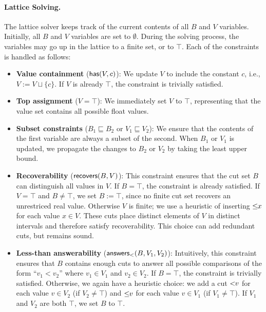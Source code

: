 \paragraph{Lattice Solving.}
The lattice solver keeps track of the current contents of all $B$ and $V$ variables.
Initially, all $B$ and $V$ variables are set to $\emptyset$.
During the solving process, the variables may go up in the lattice to a finite set, or to $\top$.
Each of the constraints is handled as follows:

\begin{itemize}[leftmargin=*]
    \item \textbf{Value containment} ($\mathsf{has}(V, c)$): We update $V$ to include the constant $c$, i.e., $V := V \sqcup \{c\}$. If $V$ is already $\top$, the constraint is trivially satisfied. 

    \item \textbf{Top assignment} ($V = \top$): We immediately set $V$ to $\top$, representing that the value set contains all possible float values. 

    \item \textbf{Subset constraints} ($B_1 \sqsubseteq B_2$ or $V_1 \sqsubseteq V_2$): We ensure that the contents of the first variable are always a subset of the second. When $B_1$ or $V_1$ is updated, we propagate the changes to $B_2$ or $V_2$ by taking the least upper bound. 

    \item \textbf{Recoverability} ($\mathsf{recovers}(B, V)$): This constraint ensures that the cut set $B$ can distinguish all values in $V$. If $B = \top$, the constraint is already satisfied. If $V = \top$ and $B \neq \top$, we set $B := \top$, since no finite cut set recovers an unrestriced real value. Otherwise $V$ is finite; we use a heuristic of inserting $\leq\!\!{x}$ for each value $x \in V$. These cuts place distinct elements of $V$ in distinct intervals and therefore satisfy recoverability. This choice can add redundant cuts, but remains sound. 

    \item \textbf{Less-than answerability} ($\mathsf{answers}_<(B, V_1, V_2)$): Intuitively, this constraint ensures that $B$ contains enough cuts to answer all possible comparisons of the form ``$v_1 < v_2$'' where $v_1 \in V_1$ and $v_2 \in V_2$.
    If $B = \top$, the constraint is trivially satisfied.
    Otherwise, we again have a heuristic choice: we add a cut $<\!\!{v}$ for each value $v \in V_2$ (if $V_2 \neq \top$) and $\leq\!\!{v}$ for each value $v \in V_1$ (if $V_1 \neq \top$). If $V_1$ and $V_2$ are both $\top$, we set $B$ to $\top$. 


\end{itemize}
